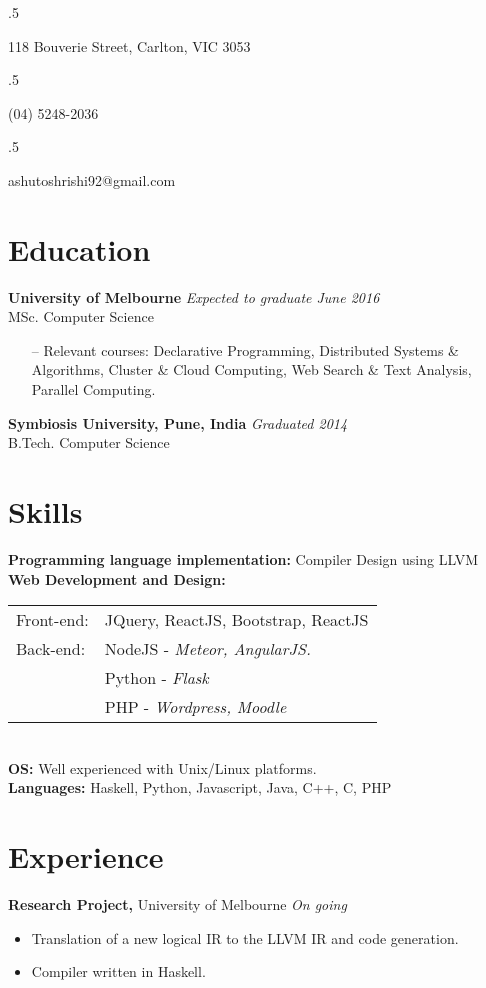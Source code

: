 \documentclass[margin]{res}
\begin{document}

\begin{resume}
  \moveleft.5\hoffset\centerline{118 Bouverie Street, Carlton, VIC 3053}
  \moveleft.5\hoffset\centerline{(04) 5248-2036}
  \moveleft.5\hoffset\centerline{ashutoshrishi92@gmail.com}
  
  \section{Education}  
  \textbf{University of Melbourne} \hfill \textit{Expected to graduate June 2016} \\
  MSc. Computer Science 
  \begin{itemize} \itemsep -2pt
  \item[--] Relevant courses: Declarative Programming, Distributed Systems \&\\ 
    Algorithms, Cluster \& Cloud Computing, Web Search \& Text Analysis, \\ 
    Parallel Computing.
  \end{itemize}

  \textbf{Symbiosis University, Pune, India} \hfill \textit{Graduated 2014} \\
  B.Tech. Computer Science 

  \section{Skills}  
  \textbf{Programming language implementation:} Compiler Design using LLVM \\
  \textbf{Web Development and Design:} \\
  \begin{tabular}{l l}
    Front-end: & JQuery, ReactJS, Bootstrap, ReactJS \\
    Back-end: & NodeJS -  \textit{Meteor, AngularJS.}\\ 
              & Python -  \textit{Flask} \\
              & PHP -  \textit{Wordpress, Moodle} \\

  \end{tabular}\\
  \textbf{OS:} Well experienced with Unix/Linux platforms. \\  
  \textbf{Languages:} Haskell, Python, Javascript, Java, C++, C, PHP 

  \section{Experience}
  \textbf{Research Project,} University of Melbourne \hfill \textit{On going}
  \begin{itemize} \itemsep -2pt
  \item Translation of a new logical IR to the LLVM IR and code generation.
  \item Compiler written in Haskell.
  \end{itemize}


\end{resume}
\end{document}
